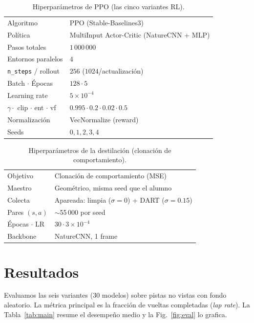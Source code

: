 \documentclass[conference]{IEEEtran}
\begin{document}
\begin{table}[H]
\caption{Hiperpar\'ametros de PPO (las cinco variantes RL).}
\label{tab:ppo}
\centering
\small
\begin{tabular}{@{}ll@{}}
\toprule
Algoritmo & PPO (Stable-Baselines3) \\
Pol\'itica & MultiInput Actor-Critic (NatureCNN + MLP) \\
Pasos totales & $1\,000\,000$ \\
Entornos paralelos & $4$ \\
\texttt{n\_steps} / rollout & $256$ ($1024$/actualizaci\'on) \\
Batch $\cdot$ \'Epocas & $128 \cdot 5$ \\
Learning rate & $5\times10^{-4}$ \\
$\gamma \cdot$ clip $\cdot$ ent $\cdot$ vf & $0.995 \cdot 0.2 \cdot 0.02 \cdot 0.5$ \\
Normalizaci\'on & VecNormalize (reward) \\
Seeds & $0,1,2,3,4$ \\
\bottomrule
\end{tabular}
\end{table}

\begin{table}[H]
\caption{Hiperpar\'ametros de la destilaci\'on (clonaci\'on de comportamiento).}
\label{tab:distill}
\centering
\small
\begin{tabular}{@{}ll@{}}
\toprule
Objetivo & Clonaci\'on de comportamiento (MSE) \\
Maestro & Geom\'etrico, misma seed que el alumno \\
Colecta & Apareada: limpia ($\sigma{=}0$) + DART ($\sigma{=}0.15$) \\
Pares $(s,a)$ & $\sim$55\,000 por seed \\
\'Epocas $\cdot$ LR & $30 \cdot 3\times10^{-4}$ \\
Backbone & NatureCNN, 1 frame \\
\bottomrule
\end{tabular}
\end{table}

\section{Resultados}
Evaluamos las seis variantes ($30$ modelos) sobre pistas no vistas con fondo aleatorio. La
m\'etrica principal es la fracci\'on de vueltas completadas (\emph{lap rate}). La
Tabla~\ref{tab:main} resume el desempe\~no medio y la Fig.~\ref{fig:eval} lo grafica.
\end{document}
